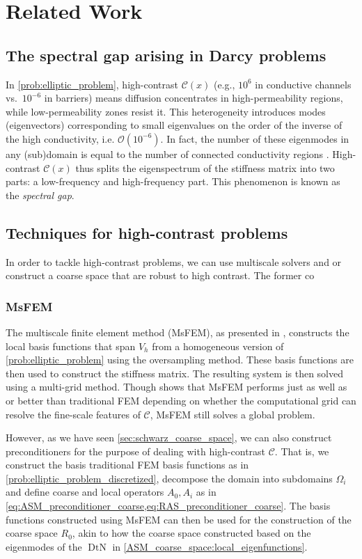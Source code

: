 \chapter{Related Work}\label{ch:literature}
\section{The spectral gap arising in Darcy problems}\label{sec:spectral_gap_darcy}
In \cref{prob:elliptic_problem}, high-contrast $\mathcal{C}(x)$ (e.g., $10^6$ in conductive channels vs.\ $ 10^{-6} $ in barriers) means diffusion concentrates in high-permeability regions, while low-permeability zones resist it. This heterogeneity introduces modes (eigenvectors) corresponding to small eigenvalues on the order of the inverse of the high conductivity, i.e. $\mathcal{O}(10^{-6})$. In fact, the number of these eigenmodes in any (sub)domain is equal to the number of connected conductivity regions \cite{ddp_for_multiscale_flows_in_high_contrast_media_Galvis2010}. High-contrast $\mathcal{C}(x)$ thus splits the eigenspectrum of the stiffness matrix into two parts: a low-frequency and high-frequency part. This phenomenon is known as the \textit{spectral gap}.

\section{Techniques for high-contrast problems}\label{sec:tailored_coarse_spaces}
In order to tackle high-contrast problems, we can use multiscale solvers and or construct a coarse space that are robust to high contrast. The former co

\subsection{MsFEM} 
The multiscale finite element method (MsFEM), as presented in \cite{og_msfem_Hou1997}, constructs the local basis functions that span $V_h$ from a homogeneous version of \cref{prob:elliptic_problem} using the oversampling method. These basis functions are then used to construct the stiffness matrix. The resulting system is then solved using a multi-grid method. Though \citeauthor{og_msfem_Hou1997} shows that MsFEM performs just as well as or better than traditional FEM depending on whether the computational grid can resolve the fine-scale features of $\mathcal{C}$, MsFEM still solves a global problem. 

However, as we have seen \cref{sec:schwarz_coarse_space}, we can also construct preconditioners for the purpose of dealing with high-contrast $\mathcal{C}$. That is, we construct the basis traditional FEM basis functions as in \cref{prob:elliptic_problem_discretized}, decompose the domain into subdomains $\Omega_i$ and define coarse and local operators $A_0, A_i$ as in \cref{eq:ASM_preconditioner_coarse,eq:RAS_preconditioner_coarse}. The basis functions constructed using MsFEM can then be used for the construction of the coarse space $R_0$, akin to how the coarse space constructed based on the eigenmodes of the $\operatorname{DtN}$ in \cref{ASM_coarse_space:local_eigenfunctions}. 

